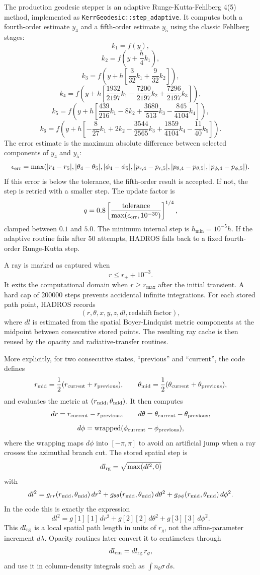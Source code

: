 \documentclass[11pt,a4paper]{article}
\begin{document}
The production geodesic stepper is an adaptive Runge-Kutta-Fehlberg 4(5)
method, implemented as \texttt{KerrGeodesic::step\_adaptive}. It computes both
a fourth-order estimate $y_4$ and a fifth-order estimate $y_5$ using the
classic Fehlberg stages:
\[
k_1=f(y),
\]
\[
k_2=f\left(y+\frac{h}{4}k_1\right),
\]
\[
k_3=f\left(y+h\left[\frac{3}{32}k_1+\frac{9}{32}k_2\right]\right),
\]
\[
k_4=f\left(y+h\left[\frac{1932}{2197}k_1-\frac{7200}{2197}k_2
+\frac{7296}{2197}k_3\right]\right),
\]
\[
k_5=f\left(y+h\left[\frac{439}{216}k_1-8k_2+\frac{3680}{513}k_3
-\frac{845}{4104}k_4\right]\right),
\]
\[
k_6=f\left(y+h\left[-\frac{8}{27}k_1+2k_2-\frac{3544}{2565}k_3
+\frac{1859}{4104}k_4-\frac{11}{40}k_5\right]\right).
\]
The error estimate is the maximum absolute difference between selected
components of $y_4$ and $y_5$:
\[
\epsilon_{\rm err}=
\max(|r_4-r_5|,|\theta_4-\theta_5|,|\phi_4-\phi_5|,
|p_{r,4}-p_{r,5}|,|p_{\theta,4}-p_{\theta,5}|,
|p_{\phi,4}-p_{\phi,5}|).
\]
If this error is below the tolerance, the fifth-order result is accepted. If
not, the step is retried with a smaller step. The update factor is
\[
q=0.8\left[\frac{\mathrm{tolerance}}
{\max(\epsilon_{\rm err},10^{-30})}\right]^{1/4},
\]
clamped between $0.1$ and $5.0$. The minimum internal step is
$h_{\min}=10^{-5}h$. If the adaptive routine fails after 50 attempts, HADROS
falls back to a fixed fourth-order Runge-Kutta step.

A ray is marked as captured when
\[
r\le r_+ + 10^{-3}.
\]
It exits the computational domain when $r\ge r_{\max}$ after the initial
transient. A hard cap of 200000 steps prevents accidental infinite
integrations. For each stored path point, HADROS records
\[
(r,\theta,x,y,z,dl,\mathrm{redshift\ factor}),
\]
where $dl$ is estimated from the spatial Boyer-Lindquist metric components at
the midpoint between consecutive stored points. The resulting ray cache is then
reused by the opacity and radiative-transfer routines.

More explicitly, for two consecutive states, ``previous'' and ``current'', the
code defines
\[
r_{\rm mid}=\frac{1}{2}(r_{\rm current}+r_{\rm previous}),\qquad
\theta_{\rm mid}=\frac{1}{2}(\theta_{\rm current}+\theta_{\rm previous}),
\]
and evaluates the metric at $(r_{\rm mid},\theta_{\rm mid})$. It then computes
\[
dr=r_{\rm current}-r_{\rm previous},\qquad
d\theta=\theta_{\rm current}-\theta_{\rm previous},
\]
\[
d\phi=\mathrm{wrapped}(\phi_{\rm current}-\phi_{\rm previous}),
\]
where the wrapping maps $d\phi$ into $[-\pi,\pi]$ to avoid an artificial jump
when a ray crosses the azimuthal branch cut. The stored spatial step is
\[
dl_{\rm rg}=\sqrt{\max(dl^2,0)}
\]
with
\[
dl^2 =
g_{rr}(r_{\rm mid},\theta_{\rm mid})\,dr^2
+g_{\theta\theta}(r_{\rm mid},\theta_{\rm mid})\,d\theta^2
+g_{\phi\phi}(r_{\rm mid},\theta_{\rm mid})\,d\phi^2.
\]
In the code this is exactly the expression
\[
dl^2 = g[1][1]\,dr^2+g[2][2]\,d\theta^2+g[3][3]\,d\phi^2.
\]
This $dl_{\rm rg}$ is a local spatial path length in units of $r_g$, not the
affine-parameter increment $d\lambda$. Opacity routines later convert it to
centimeters through
\[
dl_{\rm cm}=dl_{\rm rg}\,r_g,
\]
and use it in column-density integrals such as $\int n_b\sigma\,ds$.
\end{document}
